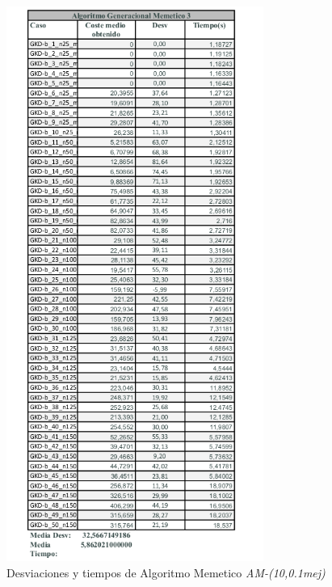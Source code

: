 \documentclass{article}
\begin{document}
\begin{figure}[h]
  \centering
  \includegraphics[width=0.75\textwidth]{capturastablas/Memetico3.png}
  \caption{Desviaciones y tiempos de Algoritmo Memetico \emph{AM-(10,0.1mej)}}
\end{figure}
\end{document}
